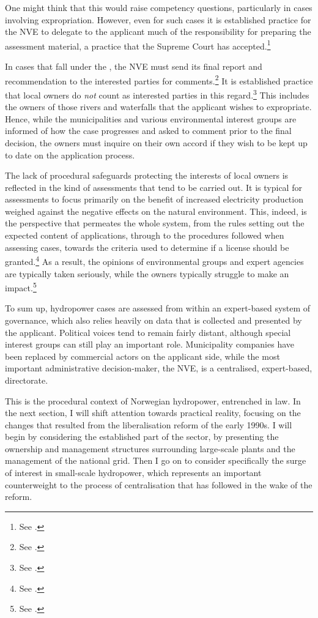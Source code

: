 One might think that this would raise competency questions, particularly in cases involving expropriation. However, even for such cases it is established practice for the NVE to delegate to the applicant much of the responsibility for preparing the assessment material, a practice that the Supreme Court has accepted.\footnote{See \cite{jorpeland11}.}

In cases that fall under the \cite{wra17}, the NVE must send its final report and recommendation to the interested parties for comments.\footnote{See \cite[6]{wra17}.} It is established practice that local owners do {\it not} count as interested parties in this regard.\footnote{See \cite{jorpeland11}.} This includes the owners of those rivers and waterfalls that the applicant wishes to expropriate. Hence, while the municipalities and various environmental interest groups are informed of how the case progresses and asked to comment prior to the final decision, the owners must inquire on their own accord if they wish to be kept up to date on the application process.

The lack of procedural safeguards protecting the interests of local owners is reflected in the kind of assessments that tend to be carried out. It is typical for assessments to focus primarily on the benefit of increased electricity production weighed against the negative effects on the natural environment. This, indeed, is the perspective that permeates the whole system, from the rules setting out the expected content of applications, through to the procedures followed when assessing cases, towards the criteria used to determine if a license should be granted.\footnote{See \cite{stokker10}.} As a result, the opinions of environmental groups and expert agencies are typically taken seriously, while the owners typically struggle to make an impact.\footnote{See \cite{jorpeland11}.}

To sum up, hydropower cases are assessed from within an expert-based system of governance, which also relies heavily on data that is collected and presented by the applicant. Political voices tend to remain fairly distant, although special interest groups can still play an important role. Municipality companies have been replaced by commercial actors on the applicant side, while the most important administrative decision-maker, the NVE, is a centralised, expert-based, directorate.

This is the procedural context of Norwegian hydropower, entrenched in law. In the next section, I will shift attention towards practical reality, focusing on the changes that resulted from the liberalisation reform of the early 1990s. I will begin by considering the established part of the sector, by presenting the ownership and management structures surrounding large-scale plants and the management of the national grid. Then I go on to consider specifically the surge of interest in small-scale hydropower, which represents an important counterweight to the process of centralisation that has followed in the wake of the reform.

